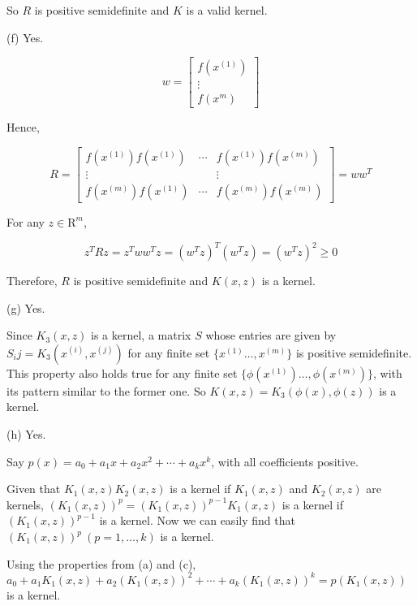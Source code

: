 \begin{answer}
	So $R$ is positive semidefinite and $K$ is a valid kernel.
	
	(f) Yes.
	
	$$
	w=\begin{bmatrix}
		f(x^{(1)})\\
		\vdots\\
		f(x^{m})
	\end{bmatrix}
	$$
	
	 Hence,
	 
	 $$
	 R=\begin{bmatrix}
	 	f(x^{(1)})f(x^{(1)}) & \cdots & f(x^{(1)})f(x^{(m)})\\
	 	\vdots & & \vdots\\
	 	f(x^{(m)})f(x^{(1)}) & \cdots & f(x^{(m)})f(x^{(m)})
	 \end{bmatrix}
	 =w w^T
	 $$
	 
	 For any $z\in \mathrm R^m$,
	 
	 $$
	 z^T R z = z^T w w^T z = (w^T z)^T (w^T z) = (w^T z)^2 \ge 0 
	 $$
	 
	 Therefore, $R$ is positive semidefinite and $K(x, z)$ is a kernel.
	 
	 
	 
	 (g) Yes.
	 
	 Since $K_3(x, z)$ is a kernel, a matrix $S$ whose entries are given by $S_ij = K_3(x^{(i)}, x^{(j)})$ for any finite set $\{x^{(1)}\ldots,x^{(m)}\}$ is positive semidefinite. This property also holds true for any finite set $\{\phi(x^{(1)})\ldots,\phi(x^{(m)})\}$, with its pattern similar to the former one. So $K(x, z) = K_3(\phi(x), \phi(z))$ is a kernel.
	 
	 
	 
	 (h) Yes.
	 
	 Say $p(x)=a_0 + a_1 x + a_2 x^2 + \cdots + a_k x^k$, with all coefficients positive.
	 
	 Given that $K_1(x, z)K_2(x, z)$ is a kernel if $K_1(x, z)$ and $K_2(x, z)$ are kernels, $(K_1(x, z))^p=(K_1(x, z))^{p-1}K_1(x, z)$ is a kernel if $(K_1(x, z))^{p-1}$ is a kernel. Now we can easily find that $(K_1(x, z))^p\ (p=1,\ldots,k)$ is a kernel.
	 
	 Using the properties from (a) and (c), $a_0 + a_1 K_1(x, z) + a_2 (K_1(x, z))^2 + \cdots + a_k (K_1(x, z))^k = p(K_1(x, z))$ is a kernel.
\end{answer}
